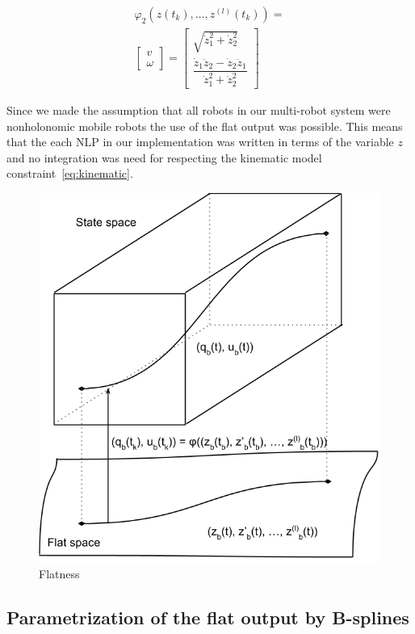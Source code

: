 \begin{equation}\label{eq:phi2}
\begin{array}{l}
            \varphi_2(z(t_k),\dotsc,z^{(l)}(t_k))=\\
            \left[\begin{array}{c}
            v\\
            \omega
            \end{array}\right]
            = \left[\begin{array}{c}
            \sqrt{\dot{z}_{1}^{2} + \dot{z}_{2}^{2}}\\
            \dfrac{\dot{z}_{1}\ddot{z}_{2} -
            \dot{z}_{2}\ddot{z}_{1}}{\dot{z}_{1}^{2}+\dot{z}_{2}^{2}}
            \end{array}\right]
            \end{array}
\end{equation}


Since we made the assumption that all robots in our multi-robot system were nonholonomic mobile robots the use of the flat output was possible. This means that
the each NLP in our implementation was written in terms of the variable $z$ and no integration was need for respecting the kinematic model constraint~\ref{eq:kinematic}.


\begin{figure}[H]\centering
  \includegraphics[width=.6\linewidth]{./images/flatness.png} %
  \caption{Flatness\label{fig:flatness}}
\label{fig:res}
\end{figure}

\subsection{Parametrization of the flat output by B-splines}


